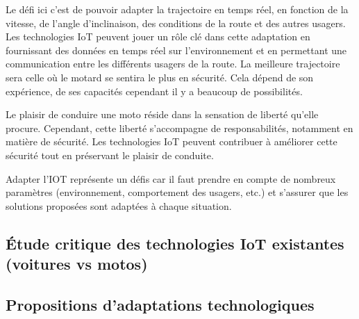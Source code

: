 
Le défi ici c'est de pouvoir adapter la trajectoire en temps réel, en fonction de la vitesse, de l'angle d'inclinaison, des conditions de la route et des autres usagers. Les technologies IoT peuvent jouer un rôle clé dans cette adaptation en fournissant des données en temps réel sur l'environnement et en permettant une communication entre les différents usagers de la route. La meilleure trajectoire sera celle où le motard se sentira le plus  en sécurité. Cela dépend de son expérience, de ses capacités cependant il y a beaucoup de possibilités.


\vspace{0.5cm}
Le plaisir de conduire une moto réside dans la sensation de liberté qu'elle procure. Cependant, cette liberté s'accompagne de responsabilités, notamment en matière de sécurité. Les technologies IoT peuvent contribuer à améliorer cette sécurité tout en préservant le plaisir de conduite.

\vspace{0.5cm}
Adapter l'IOT représente un défis car il faut prendre en compte de nombreux paramètres (environnement, comportement des usagers, etc.) et s'assurer que les solutions proposées sont adaptées à chaque situation.

\newpage
\subsection{ Étude critique des technologies IoT existantes (voitures vs motos)}

\subsection{ Propositions d’adaptations technologiques}

